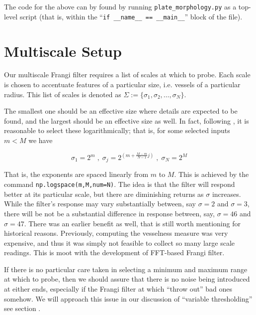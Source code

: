 	The code for the above can by found by running \texttt{plate\_morphology.py} as a top-level script (that is, within the ``\texttt{if \_\_name\_\_ == \_\_main\_\_}'' block of the file).
	
\section{Multiscale Setup}

	Our multiscale Frangi filter requires a list of scales at which to probe. Each scale is chosen to accentuate features of a particular size, i.e. vessels of a particular radius. This  list of scales is denoted as $\Sigma := \{ \sigma_1, \sigma_2, \dots, \sigma_N\}$. 
	 
	The smallest one should be an effective size where details are expected to be found, and the largest should be an effective size as well. In fact, following , it is reasonable to select these logarithmically; that is,
	for some selected inputs $m < M$ we have
	
	\begin{equation}
	\sigma_1 = 2^{m} \; , \; \sigma_{j} = 2^{\left(m+\frac{M-m}{N-1}j\right)} \; , \; \sigma_N = 2^{M} \end{equation}
	
	That is, the exponents are spaced linearly from $m$ to $M$. This is achieved by the command
	\texttt{np.logspace(m,M,num=N)}. The idea is that the filter will respond better at its particular scale, but there are diminishing returns as $\sigma$ increases. While the filter's response may vary substantially between, say $\sigma=2$ and $\sigma=3$, there will be not be a substantial difference in response between, say, $\sigma=46$ and $\sigma=47$. There was an earlier benefit as well, that is still worth mentioning for historical reasons. Previously, computing the vesselness measure was very expensive, and thus it was simply not feasible to collect so many large scale readings. This is moot with the development of FFT-based Frangi filter.
	
	If there is no particular care taken in selecting a minimum and maximum range at which to probe, then we should assure that there is no noise being introduced at either ends, especially if the Frangi filter at which   ``throw out'' bad ones somehow. We will approach this issue in our discussion of ``variable thresholding'' see section .
	
	
	
	
	
